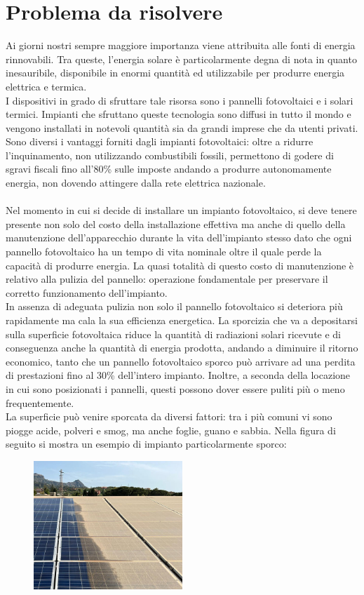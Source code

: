 \documentclass[a4paper, 12pt]{article}
\begin{document}
	\section{Problema da risolvere}
	Ai giorni nostri sempre maggiore importanza viene attribuita alle fonti di energia rinnovabili. Tra queste, l'energia solare è particolarmente degna di nota in quanto inesauribile, disponibile in enormi quantità ed utilizzabile per produrre energia elettrica e termica.\\
	I dispositivi in grado di sfruttare tale risorsa sono i pannelli fotovoltaici e i solari termici. Impianti che sfruttano queste tecnologia sono diffusi in tutto il mondo e vengono installati in notevoli quantità sia da grandi imprese che da utenti privati. Sono diversi i vantaggi forniti dagli impianti fotovoltaici: oltre a ridurre l'inquinamento, non utilizzando combustibili fossili, permettono di godere di sgravi fiscali fino all'80\% sulle imposte andando a produrre autonomamente energia, non dovendo attingere dalla rete elettrica nazionale.\\\\
	Nel momento in cui si decide di installare un impianto fotovoltaico, si deve tenere presente non solo del costo della installazione effettiva ma anche di quello della manutenzione dell'apparecchio durante la vita dell'impianto stesso dato che ogni pannello fotovoltaico ha un tempo di vita nominale oltre il quale perde la capacità di produrre energia. La quasi totalità di questo costo di manutenzione è relativo alla pulizia del pannello: operazione fondamentale per preservare il corretto funzionamento dell'impianto.\\
	In assenza di adeguata pulizia non solo il pannello fotovoltaico si deteriora più rapidamente ma cala la sua efficienza energetica. La sporcizia che va a depositarsi sulla superficie fotovoltaica riduce la quantità di radiazioni solari ricevute e di conseguenza anche la quantità di energia prodotta, andando a diminuire il ritorno economico, tanto che un pannello fotovoltaico sporco può arrivare ad una perdita di prestazioni fino al 30\% dell'intero impianto. Inoltre, a seconda della locazione in cui sono posizionati i pannelli, questi possono dover essere puliti più o meno frequentemente.\\
	La superficie può venire sporcata da diversi fattori: tra i più comuni vi sono piogge acide, polveri e smog, ma anche foglie, guano e sabbia. Nella figura di seguito si mostra un esempio di impianto particolarmente sporco:
	\begin{figure}[h]
		\centering\includegraphics[width=0.5\textwidth]{Images/pannelli_sporchi2.jpg}
	\end{figure}\\
\end{document}
